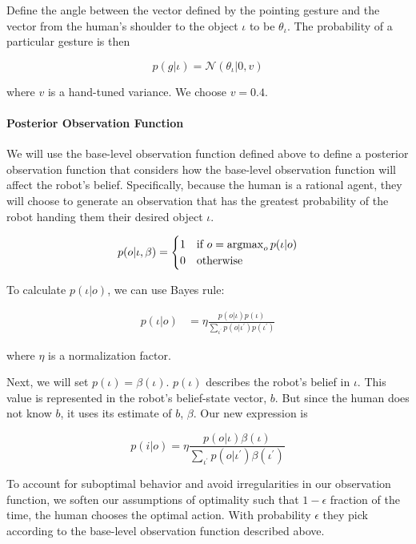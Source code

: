 \documentclass[conference]{IEEEtran}
\newcommand{\argmax}{\operatornamewithlimits{argmax}}
\begin{document}
Define the angle between the vector defined by the pointing gesture and the vector from the human's shoulder to the object $\iota$ to be $\theta_\iota$. The probability of a particular gesture is then

\begin{equation*}
p(g|\iota) = \mathcal{N}(\theta_\iota | 0, v)
\end{equation*}

where $v$ is a hand-tuned variance. We choose $v = 0.4$. 

\paragraph{Posterior Observation Function}

We will use the base-level observation function defined above to define a posterior observation function that considers how the base-level observation function will affect the robot's belief. Specifically, because the human is a rational agent, they will choose to generate an observation that has the greatest probability of the robot handing them their desired object $\iota$. 


\begin{equation*} 
	p(o | \iota, \beta) = \begin{cases}
		1 & \text{if } o = \argmax_o p(\iota|o) \\
		0 & \text{otherwise}
	\end{cases}
\end{equation*}

To calculate $p(\iota|o)$, we can use Bayes rule: 

\begin{align*}
p(\iota|o) &= \eta \frac{p(o|\iota) p(\iota)}{\sum_{\iota^\prime} p(o|\iota^\prime)p(\iota^\prime)} 
\end{align*}

where $\eta$ is a normalization factor. 

Next, we will set $p(\iota) = \beta(\iota)$. $p(\iota)$ describes the robot's belief in $\iota$. This value is represented in the robot's belief-state vector, $b$. But since the human does not know $b$, it uses its estimate of $b$, $\beta$. Our new expression is 

$$p(i|o) = \eta \frac{p(o|\iota) \beta(\iota)}{\sum_{\iota^\prime} p(o|\iota^\prime)\beta(\iota^\prime)} $$

To account for suboptimal behavior and avoid irregularities in our observation function, we soften our assumptions of optimality such that $1-\epsilon$ fraction of the time, the human chooses the optimal action. With probability $\epsilon$ they pick according to the base-level observation function described above. 
\end{document}
